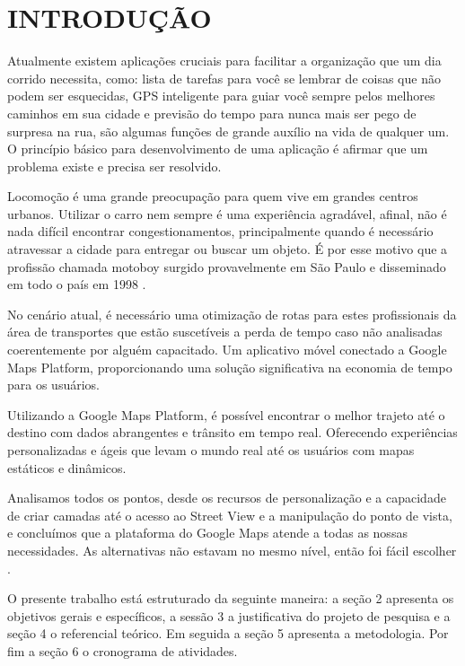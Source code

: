 
\chapter{INTRODUÇÃO}

Atualmente existem aplicações cruciais para facilitar a organização que um dia corrido necessita, como: lista de tarefas para você se lembrar de coisas que não podem ser esquecidas, GPS inteligente para guiar você sempre pelos melhores caminhos em sua cidade e previsão do tempo para nunca mais ser pego de surpresa na rua, são algumas funções de grande auxílio na vida de qualquer um. O princípio básico para desenvolvimento de uma aplicação é afirmar que um problema existe e precisa ser resolvido.

Locomoção é uma grande preocupação para quem vive em grandes centros urbanos. Utilizar o carro nem sempre é uma experiência agradável, afinal, não é nada difícil encontrar congestionamentos, principalmente quando é necessário atravessar a cidade para entregar ou buscar um objeto. É por esse motivo que a profissão chamada motoboy surgido provavelmente em São Paulo e disseminado em todo o país em 1998 \cite{MotoboyVeja}.

No cenário atual, é necessário uma otimização de rotas para estes profissionais da área de transportes que estão suscetíveis a perda de tempo caso não analisadas coerentemente por alguém capacitado. Um aplicativo móvel conectado a Google Maps Platform, proporcionando uma solução significativa na economia de tempo para os usuários.

Utilizando a Google Maps Platform, é possível encontrar o melhor trajeto até o destino com dados abrangentes e trânsito em tempo real. Oferecendo experiências personalizadas e ágeis que levam o mundo real até os usuários com mapas estáticos e dinâmicos. 

\begin{citacao}
Analisamos todos os pontos, desde os recursos de personalização e a capacidade de criar camadas até o acesso ao Street View e a manipulação do ponto de vista, e concluímos que a plataforma do Google Maps atende a todas as nossas necessidades. As alternativas não estavam no mesmo nível, então foi fácil escolher \cite{ElizabethSchreierGoogleMaps}. 
\end{citacao}

O presente trabalho está estruturado da seguinte maneira: a seção 2 apresenta os objetivos gerais e específicos, a sessão 3 a justificativa do projeto de pesquisa e a seção 4 o referencial teórico.
Em seguida a seção 5 apresenta a metodologia. Por fim a seção 6 o cronograma de atividades.

